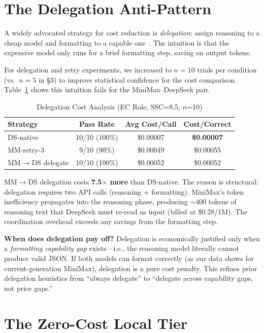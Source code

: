 \documentclass[11pt,a4paper]{article}
\begin{document}
\section{The Delegation Anti-Pattern}

A widely advocated strategy for cost reduction is \textit{delegation}: assign reasoning to a cheap model and formatting to a capable one~\cite{fable5harness}. The intuition is that the expensive model only runs for a brief formatting step, saving on output tokens.

For delegation and retry experiments, we increased to $n=10$ trials per condition (vs.\ $n=5$ in \S3) to improve statistical confidence for the cost comparison. Table~\ref{tab:delegation} shows this intuition fails for the MiniMax--DeepSeek pair.

\begin{table}[htbp]\centering\caption{Delegation Cost Analysis (EC Role, SSC=8.5, $n$=10)}\label{tab:delegation}\small
\begin{tabular}{lccc}\toprule\textbf{Strategy} & \textbf{Pass Rate} & \textbf{Avg Cost/Call} & \textbf{Cost/Correct}\\\midrule
DS-native & 10/10 (100\%) & \$0.00007 & \textbf{\$0.00007}\\
MM-retry-3 & 9/10 (90\%) & \$0.00049 & \$0.00055\\
MM$\rightarrow$DS delegate & 10/10 (100\%) & \$0.00052 & \$0.00052\\\bottomrule
\end{tabular}
\end{table}

MM$\rightarrow$DS delegation costs \textbf{7.5$\times$ more} than DS-native. The reason is structural: delegation requires two API calls (reasoning + formatting). MiniMax's token inefficiency propagates into the reasoning phase, producing $\sim$400 tokens of reasoning text that DeepSeek must re-read as input (billed at \$0.28/1M). The coordination overhead exceeds any savings from the formatting step.

\textbf{When does delegation pay off?} Delegation is economically justified only when a \textit{formatting capability gap} exists---i.e., the reasoning model literally cannot produce valid JSON. If both models can format correctly (as our data shows for current-generation MiniMax), delegation is a pure cost penalty. This refines prior delegation heuristics from ``always delegate'' to ``delegate across capability gaps, not price gaps.''

\section{The Zero-Cost Local Tier}
\end{document}
